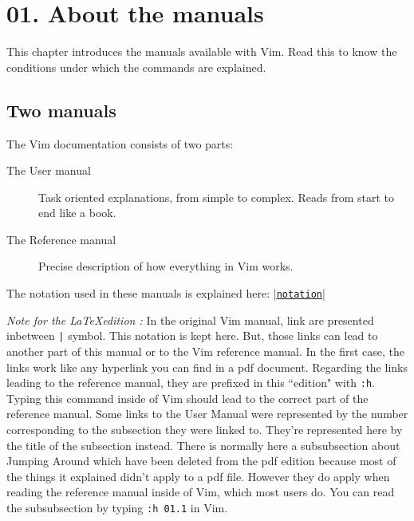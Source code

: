 \section{01. About the manuals}
This chapter introduces the manuals available with Vim.
Read this to know the conditions under which the commands are explained.
\localtableofcontents
\subsection{Two manuals}

The Vim documentation consists of two parts:
\begin{description}
				\item[The User manual]
								Task oriented explanations, from simple to complex.
								Reads from start to end like a book.
				\item[The Reference manual]
								Precise description of how everything in Vim works.
\end{description}
The notation used in these manuals is explained here: \hyperref[notation]{|\texttt{notation}|}

\textit{Note for the \LaTeX edition :}
In the original Vim manual, link are presented inbetween \texttt{|} symbol.
This notation is kept here.
But, those links can lead to another part of this manual or to the Vim reference manual.
In the first case, the links work like any hyperlink you can find in a pdf document.
Regarding the links leading to the reference manual, they are prefixed in this ``edition" with \texttt{:h}.
Typing this command inside of Vim should lead to the correct part of the reference manual.
Some links to the User Manual were represented by the number corresponding to the subsection they were linked to.
They're represented here by the title of the subsection instead.
There is normally here a subsubsection about Jumping Around which have been deleted from the pdf edition because most of the things it explained didn't apply to a pdf file.
However they do apply when reading the reference manual inside of Vim, which most users do.
You can read the subsubsection by typing \texttt{:h 01.1} in Vim.

